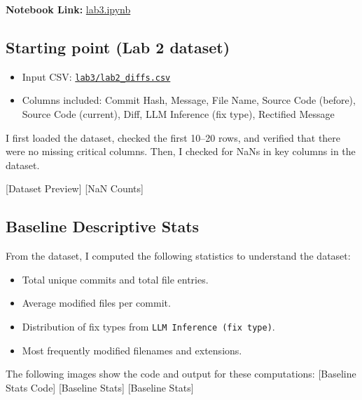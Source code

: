 \documentclass[10pt,a4paper]{report}
\begin{document}
\textbf{Notebook Link:} \href{https://github.com/ShardulJunagade/cs202-stt/blob/main/lab3/lab3.ipynb}{lab3.ipynb}

\subsection{Starting point (Lab 2 dataset)}
\begin{itemize}[itemsep=0.05em, topsep=0pt]
    \item Input CSV: \href{https://github.com/ShardulJunagade/cs202-stt/blob/main/lab3/lab2_diffs.csv}{\texttt{lab3/lab2\_diffs.csv}}
    \item Columns included: Commit Hash, Message, File Name, Source Code (before), Source Code (current), Diff, LLM Inference (fix type), Rectified Message
\end{itemize}

I first loaded the dataset, checked the first 10--20 rows, and verified that there were no missing critical columns. Then, I checked for NaNs in key columns in the dataset.

[Dataset Preview]
[NaN Counts]

\subsection{Baseline Descriptive Stats}
From the dataset, I computed the following statistics to understand the dataset:
\begin{itemize}[itemsep=0.05em, topsep=0pt]
    \item Total unique commits and total file entries.
    \item Average modified files per commit.
    \item Distribution of fix types from \texttt{LLM Inference (fix type)}.
    \item Most frequently modified filenames and extensions.
\end{itemize}

The following images show the code and output for these computations:
[Baseline Stats Code]
[Baseline Stats]
[Baseline Stats]
\end{document}
